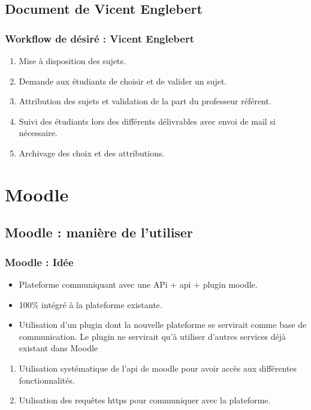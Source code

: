 \documentclass[numbering=fraction]{beamer}
\begin{document}
\subsection{Document de Vicent Englebert}
\begin{frame}
    \frametitle{Workflow de désiré : Vicent Englebert}
    \begin{enumerate}
        \item Mise à disposition des sujets.
        \item Demande aux étudiants de choisir et de valider un sujet.
        \item Attribution des sujets et validation de la part du professeur référent.
        \item Suivi des étudiants lors des différents délivrables avec envoi de mail si nécessaire.
        \item Archivage des choix et des attributions.
    \end{enumerate}


\end{frame}


\section{Moodle}
\subsection{Moodle : manière de l'utiliser}
\begin{frame}
    \frametitle{Moodle : Idée}
    \begin{itemize}
        \item Plateforme communiquant avec une APi + api + plugin moodle.
        \item 100\% intégré à la plateforme existante.
        \item Utilisation d'un plugin dont la nouvelle plateforme se servirait comme base de communication. Le plugin
        ne servirait qu'à utiliser d'autres services déjà existant dans Moodle
    \end{itemize}   
    \begin{enumerate}
        \item Utilisation systématique de l'api de moodle pour avoir accès aux différentes fonctionnalités.
        \item Utilisation des requêtes https pour communiquer avec la plateforme.
    \end{enumerate}

\end{frame}
\end{document}
